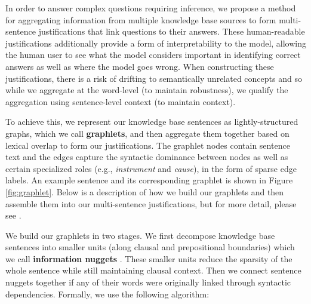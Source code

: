 In order to answer complex questions requiring inference, we propose a method for aggregating information from multiple knowledge base sources to form multi-sentence justifications that link questions to their answers.  These human-readable justifications additionally provide a form of interpretability to the model, allowing the human user to see what the model considers important in identifying correct answers as well as where the model goes wrong.  When constructing these justifications, there is a risk of drifting to semantically unrelated concepts and so while we aggregate at the word-level (to maintain robustness), we qualify the aggregation using sentence-level context (to maintain context). 

To achieve this, we represent our knowledge base sentences as lightly-structured graphs, which we call \textbf{graphlets}, and then aggregate them together based on lexical overlap to form our justifications.  The graphlet nodes contain sentence text and the edges capture the syntactic dominance between nodes as well as certain specialized roles (e.g., \emph{instrument} and \emph{cause}), in the form of sparse edge labels.  An example sentence and its corresponding graphlet is shown in Figure \ref{fig:graphlet}.  Below is a description of how we build our graphlets and then assemble them into our multi-sentence justifications, but for more detail, please see \citet{jansen2017framing}.

We build our graphlets in two stages.  We first decompose knowledge base sentences into smaller units (along clausal and prepositional boundaries) which we call \textbf{information nuggets} \citep{Voorhees:2003}.  These smaller units reduce the sparsity of the whole sentence while still maintaining clausal context.  Then we connect sentence nuggets together if any of their words were originally linked through syntactic dependencies.  Formally, we use the following algorithm:

